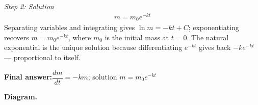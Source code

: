 \documentclass[11pt]{article}
\begin{document}
\textit{Step 2: Solution}
\[\begin{gathered}
m = m_0 e^{-kt}
\end{gathered}\]
Separating variables and integrating gives \( \ln m = -kt + C \); exponentiating recovers \( m = m_0 e^{-kt} \), where \( m_0 \) is the initial mass at \( t = 0 \). The natural exponential is the unique solution because differentiating \( e^{-kt} \) gives back \( -k e^{-kt} \) --- proportional to itself.

\begin{answerbox}
\textbf{Final answer:}\quad \(\displaystyle  \dfrac{dm}{dt} = -km \); solution \(\displaystyle  m = m_0 e^{-kt} \)
\end{answerbox}
\textbf{Diagram.}

\begin{center}
\end{center}
\end{document}
